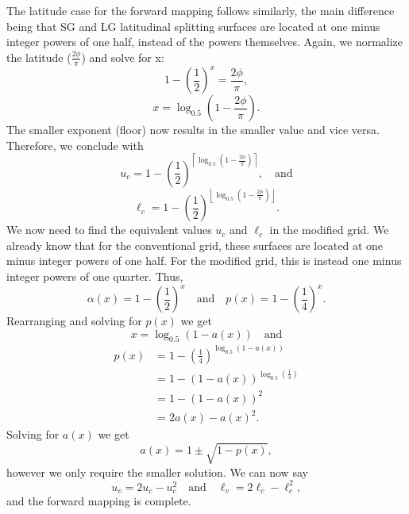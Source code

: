 The latitude case for the forward mapping follows similarly, the main difference being that SG and LG latitudinal splitting surfaces are located at one minus integer powers of one half, instead of the powers themselves. Again, we normalize the latitude ($\frac{2\phi}{\pi}$) and solve for x:
%
\begin{equation*}
1 - \left( \frac{1}{2} \right)^{x} = \frac{2\phi}{\pi},
\end{equation*}
%
\begin{equation*}
x = \log_{0.5} \left(1 - \frac{2\phi}{\pi} \right).
\end{equation*}
%
The smaller exponent (floor) now results in the smaller value and vice versa. Therefore, we conclude with
%
\begin{equation*}
u_{c} = 1 - \left( \frac{1}{2} \right)^{ \left\lceil \log_{0.5} \left( 1 - \frac{2\phi}{\pi} \right) \right\rceil}, \quad \text{and}
\end{equation*}
%
\begin{equation*}
\ell_{c} = 1 - \left( \frac{1}{2} \right)^{ \left\lfloor \log_{0.5} \left( 1 - \frac{2\phi}{\pi} \right) \right\rfloor}.
\end{equation*}
%
We now need to find the equivalent values $u_{c}$ and $\ell_{c}$ in the modified grid. We already know that for the conventional grid, these surfaces are located at one minus integer powers of one half. For the modified grid, this is instead one minus integer powers of one quarter. Thus, 
%
\begin{equation*}
\alpha(x) = 1 - \left( \frac{1}{2} \right) ^{x} \quad \text{and} \quad p(x) = 1 - \left( \frac{1}{4} \right) ^{x}.
\end{equation*}
%
Rearranging and solving for $p(x)$ we get
%
\begin{equation*}
x = \log_{0.5} \left( 1 - a \left( x \right) \right) \quad \text{and}
\end{equation*}
%
\begin{align*}
p(x) & = 1 - \left( \frac{1}{4} \right) ^{\log_{0.5} \left( 1 - a \left( x \right) \right)} \\
& = 1 - \left( 1 - a(x) \right)^{\log_{0.5} \left( \frac{1}{4} \right)} \\
& = 1 - \left( 1 - a(x) \right) ^{2} \\
& = 2 a(x) - a(x)^{2}.
\end{align*}
%
Solving for $a(x)$ we get
%
\begin{equation} 
a(x) = 1 \pm \sqrt{1 - p(x)},
\label{eq:a(x)}
\end{equation}
%
however we only require the smaller solution. We can now say 
\begin{equation*}
u_{v} = 2u_{c} - u_{c}^{2} \quad \text{and} \quad \ell_{v} = 2 \ell_{c} - \ell_{c}^{2},
\end{equation*}
and the forward mapping is complete. 

